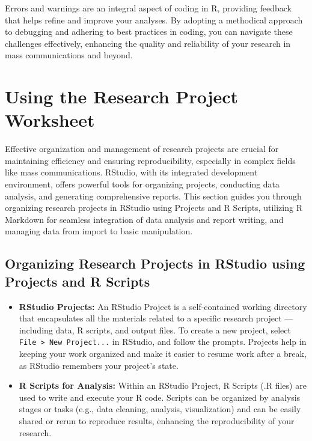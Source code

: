 \documentclass[
]{book}
\begin{document}
Errors and warnings are an integral aspect of coding in R, providing feedback that helps refine and improve your analyses. By adopting a methodical approach to debugging and adhering to best practices in coding, you can navigate these challenges effectively, enhancing the quality and reliability of your research in mass communications and beyond.

\section{Using the Research Project Worksheet}\label{using-the-research-project-worksheet}

Effective organization and management of research projects are crucial for maintaining efficiency and ensuring reproducibility, especially in complex fields like mass communications. RStudio, with its integrated development environment, offers powerful tools for organizing projects, conducting data analysis, and generating comprehensive reports. This section guides you through organizing research projects in RStudio using Projects and R Scripts, utilizing R Markdown for seamless integration of data analysis and report writing, and managing data from import to basic manipulation.

\subsection*{Organizing Research Projects in RStudio using Projects and R Scripts}\label{organizing-research-projects-in-rstudio-using-projects-and-r-scripts}

\begin{itemize}
\item
  \textbf{RStudio Projects:} An RStudio Project is a self-contained working directory that encapsulates all the materials related to a specific research project --- including data, R scripts, and output files. To create a new project, select \texttt{File\ \textgreater{}\ New\ Project...} in RStudio, and follow the prompts. Projects help in keeping your work organized and make it easier to resume work after a break, as RStudio remembers your project's state.
\item
  \textbf{R Scripts for Analysis:} Within an RStudio Project, R Scripts (.R files) are used to write and execute your R code. Scripts can be organized by analysis stages or tasks (e.g., data cleaning, analysis, visualization) and can be easily shared or rerun to reproduce results, enhancing the reproducibility of your research.
\end{itemize}
\end{document}
